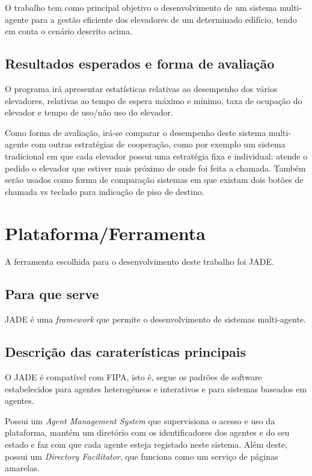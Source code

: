 \documentclass[a4paper]{article}
\begin{document}
O trabalho tem como principal objetivo o desenvolvimento de um sistema multi-agente para a gestão eficiente dos elevadores de um determinado edifício, tendo em conta o cenário descrito acima.

\subsection{Resultados esperados e forma de avaliação} 

O programa irá apresentar estatísticas relativas ao desempenho dos vários elevadores, relativas ao tempo de espera máximo e mínimo, taxa de ocupação do elevador e tempo de uso/não uso do elevador.

Como forma de avaliação, irá-se comparar o desempenho deste sistema multi-agente com outras estratégias de cooperação, como por exemplo um sistema tradicional em que cada elevador possui uma estratégia fixa e individual: atende o pedido o elevador que estiver mais próximo de onde foi feita a chamada. Também serão usados como forma de comparação sistemas em que existam dois botões de chamada vs teclado para indicação de piso de destino.

\newpage

\section{Plataforma/Ferramenta}

A ferramenta escolhida para o desenvolvimento deste trabalho foi JADE.

\subsection{Para que serve} 

JADE é uma \textit{framework} que permite o desenvolvimento de sistemas multi-agente.

\subsection{Descrição das caraterísticas principais} 

O JADE é compatível com FIPA, isto é, segue os padrões de software estabelecidos para agentes heterogéneos e interativos e para sistemas baseados em agentes.

Possui um \textit{Agent Management System} que supervisiona o acesso e uso da plataforma, mantém um diretório com os identificadores dos agentes e do seu estado e faz com que cada agente esteja registado neste sistema. Além deste, possui um \textit{Directory Facilitator}, que funciona como um serviço de páginas amarelas.
\end{document}
